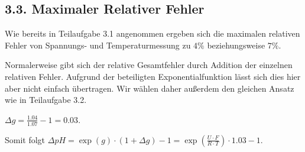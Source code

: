 \documentclass[12pt,a4paper]{article}
\begin{document}
\subsection*{3.3. Maximaler Relativer Fehler}
Wie bereits in Teilaufgabe 3.1 angenommen ergeben sich die maximalen relativen Fehler von Spannungs- und Temperaturmessung zu $4\%$ beziehungsweise $7\%$.

Normalerweise gibt sich der relative Gesamtfehler durch Addition der einzelnen relativen Fehler. Aufgrund der beteiligten Exponentialfunktion lässt sich dies hier aber nicht einfach übertragen. Wir wählen daher außerdem den gleichen Ansatz wie in Teilaufgabe 3.2.

$\Delta g = \frac{1.04}{1.07} - 1 = 0.03$.

Somit folgt $\Delta pH = \exp(g) \cdot (1 + \Delta g) - 1 = \exp\left(\frac{U \cdot F}{R \cdot T}\right) \cdot 1.03 -1$.
\end{document}
